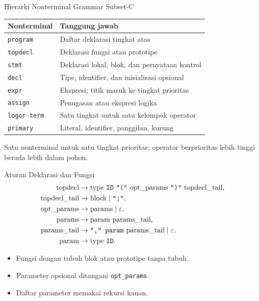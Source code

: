 \documentclass[aspectratio=169,10pt,t]{beamer}
\begin{document}
\begin{frame}{Hierarki Nonterminal Grammar Subset-C}
  \small
  \setlength{\tabcolsep}{4pt}
  \begin{tabular}{@{}p{3.4cm}p{9.8cm}@{}}
    \toprule
    \textbf{Nonterminal} & \textbf{Tanggung jawab} \\
    \midrule
    \texttt{program} & Daftar deklarasi tingkat atas \\
    \texttt{topdecl} & Deklarasi fungsi atau prototipe \\
    \texttt{stmt} & Deklarasi lokal, blok, dan pernyataan kontrol \\
    \texttt{decl} & Tipe, identifier, dan inisialisasi opsional \\
    \texttt{expr} & Ekspresi; titik masuk ke tingkat prioritas \\
    \texttt{assign} & Penugasan atau ekspresi logika \\
    \texttt{logor}--\texttt{term} & Satu tingkat untuk satu kelompok operator \\
    \texttt{primary} & Literal, identifier, panggilan, kurung \\
    \bottomrule
  \end{tabular}

  \vspace{4pt}
  {\footnotesize\color{ubbblue!80}Satu nonterminal untuk satu tingkat
  prioritas; operator berprioritas lebih tinggi berada lebih dalam
  pohon.}
\end{frame}

\begin{frame}{Aturan Deklarasi dan Fungsi}
  \small
  \[
  \begin{aligned}
    \text{topdecl} &\to \text{type}\ \texttt{ID}\ \texttt{"("}\
      \text{opt\_params}\ \texttt{")"}\ \text{topdecl\_tail},\\
    \text{topdecl\_tail} &\to \text{block} \mid \texttt{";"},\\
    \text{opt\_params} &\to \text{params} \mid \varepsilon,\\
    \text{params} &\to \text{param}\ \text{params\_tail},\\
    \text{params\_tail} &\to \texttt{"," param}\ \text{params\_tail}
      \mid \varepsilon,\\
    \text{param} &\to \text{type}\ \texttt{ID}.
  \end{aligned}
  \]

  \vspace{3pt}
  \begin{itemize}
    \item Fungsi dengan tubuh blok atau prototipe tanpa tubuh.
    \item Parameter opsional ditangani \texttt{opt\_params}.
    \item Daftar parameter memakai rekursi kanan.
  \end{itemize}
\end{frame}
\end{document}
